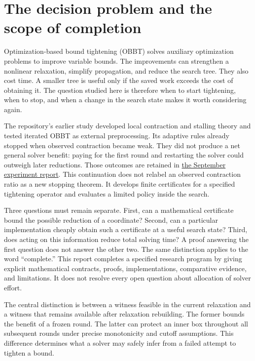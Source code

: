 \section{The decision problem and the scope of completion}\label{sec:introduction}

Optimization-based bound tightening (OBBT) solves auxiliary optimization
problems to improve variable bounds. The improvements can strengthen a
nonlinear relaxation, simplify propagation, and reduce the search tree.
They also cost time. A smaller tree is useful only if the saved work exceeds
the cost of obtaining it. The question studied here is therefore when to
start tightening, when to stop, and when a change in the search state makes
it worth considering again.

The repository's earlier study developed local contraction and stalling
theory and tested iterated OBBT as external preprocessing. Its adaptive
rules already stopped when observed contraction became weak. They did not
produce a net general solver benefit: paying for the first round and
restarting the solver could outweigh later reductions. Those outcomes are
retained in
\href{run:../../research-20260922/iterated-obbt/experiment-report.md}{the September experiment report}.
This continuation does not relabel an observed contraction ratio as a new
stopping theorem. It develops finite certificates for a specified
tightening operator and evaluates a limited policy inside the search.

Three questions must remain separate. First, can a mathematical certificate
bound the possible reduction of a coordinate? Second, can a particular
implementation cheaply obtain such a certificate at a useful search
state? Third, does acting on this information reduce total solving time?
A proof answering the first question does not answer the other two.
The same distinction applies to the word ``complete.'' This report
completes a specified research program by giving explicit mathematical
contracts, proofs, implementations, comparative evidence, and limitations.
It does not resolve every open question about allocation of solver effort.

The central distinction is between a witness feasible in the current
relaxation and a witness that remains available after relaxation rebuilding.
The former bounds the benefit of a frozen round. The latter can protect an
inner box throughout all subsequent rounds under precise monotonicity and
cutoff assumptions. This difference determines what a solver may safely
infer from a failed attempt to tighten a bound.

